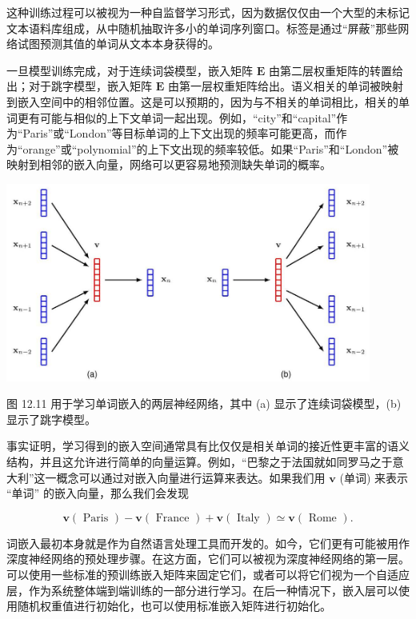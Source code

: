 \documentclass[10pt]{article}
\begin{document}
这种训练过程可以被视为一种自监督学习形式，因为数据仅仅由一个大型的未标记文本语料库组成，从中随机抽取许多小的单词序列窗口。标签是通过“屏蔽”那些网络试图预测其值的单词从文本本身获得的。

一旦模型训练完成，对于连续词袋模型，嵌入矩阵 \(\mathbf{E}\) 由第二层权重矩阵的转置给出；对于跳字模型，嵌入矩阵 \(\mathbf{E}\) 由第一层权重矩阵给出。语义相关的单词被映射到嵌入空间中的相邻位置。这是可以预期的，因为与不相关的单词相比，相关的单词更有可能与相似的上下文单词一起出现。例如，“city”和“capital”作为“Paris”或“London”等目标单词的上下文出现的频率可能更高，而作为“orange”或“polynomial”的上下文出现的频率较低。如果“Paris”和“London”被映射到相邻的嵌入向量，网络可以更容易地预测缺失单词的概率。

\begin{center}
\includegraphics[max width=0.9\textwidth]{images/0194e279-9b28-703a-88f4-c3ac21e2010d_395_288_341_1171_638_0.jpg}
\end{center}
\hspace*{3em} 

图 12.11 用于学习单词嵌入的两层神经网络，其中 (a) 显示了连续词袋模型，(b) 显示了跳字模型。

事实证明，学习得到的嵌入空间通常具有比仅仅是相关单词的接近性更丰富的语义结构，并且这允许进行简单的向量运算。例如，“巴黎之于法国就如同罗马之于意大利”这一概念可以通过对嵌入向量进行运算来表达。如果我们用 \(\mathbf{v}\) (单词) 来表示 “单词” 的嵌入向量，那么我们会发现

\[
\mathbf{v}\left( \text{ Paris }\right)  - \mathbf{v}\left( \text{ France }\right)  + \mathbf{v}\left( \text{ Italy }\right)  \simeq  \mathbf{v}\left( \text{ Rome }\right) . \tag{12.27}
\]

词嵌入最初本身就是作为自然语言处理工具而开发的。如今，它们更有可能被用作深度神经网络的预处理步骤。在这方面，它们可以被视为深度神经网络的第一层。可以使用一些标准的预训练嵌入矩阵来固定它们，或者可以将它们视为一个自适应层，作为系统整体端到端训练的一部分进行学习。在后一种情况下，嵌入层可以使用随机权重值进行初始化，也可以使用标准嵌入矩阵进行初始化。
\end{document}
